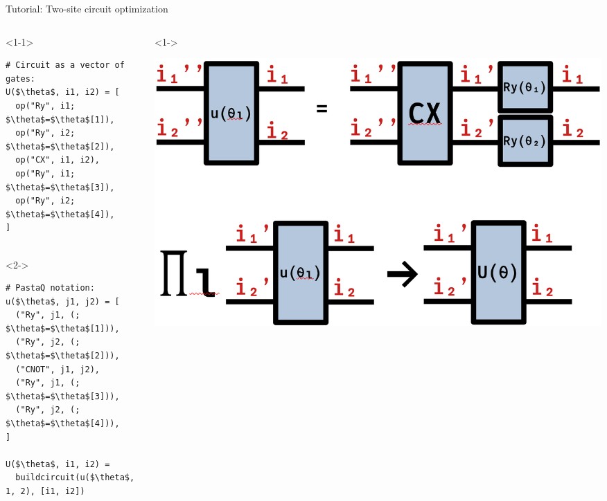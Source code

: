 \begin{frame}[fragile]{Tutorial: Two-site circuit optimization}

\begin{columns}

\begin{column}{5cm}

\begin{onlyenv}<1-1>
\begin{lstlisting}[language=JuliaLocal, style=julia, mathescape, basicstyle=\small]
# Circuit as a vector of gates:
U($\theta$, i1, i2) = [
  op("Ry", i1; $\theta$=$\theta$[1]),
  op("Ry", i2; $\theta$=$\theta$[2]),
  op("CX", i1, i2),
  op("Ry", i1; $\theta$=$\theta$[3]),
  op("Ry", i2; $\theta$=$\theta$[4]),
]


 \end{lstlisting}
\end{onlyenv}

\begin{onlyenv}<2->
\begin{lstlisting}[language=JuliaLocal, style=julia, numbers=none, mathescape, basicstyle=\small]
# PastaQ notation:
u($\theta$, j1, j2) = [
  ("Ry", j1, (; $\theta$=$\theta$[1])),
  ("Ry", j2, (; $\theta$=$\theta$[2])),
  ("CNOT", j1, j2),
  ("Ry", j1, (; $\theta$=$\theta$[3])),
  ("Ry", j2, (; $\theta$=$\theta$[4])),
]

U($\theta$, i1, i2) =
  buildcircuit(u($\theta$, 1, 2), [i1, i2])
\end{lstlisting}
\end{onlyenv}

\end{column}

\begin{column}{5cm}

\begin{onlyenv}<1->
\vspace*{0.0cm}
\begin{center}
\includegraphics[width=1.0\textwidth]{
  slides/assets/U12.png
}
\end{center}
\vspace*{0.0cm}
\end{onlyenv}

\end{column}

\end{columns}

\end{frame}
